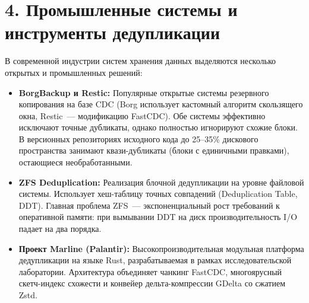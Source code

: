 \documentclass[a4paper,14pt]{extarticle}
\begin{document}
\section*{4. Промышленные системы и инструменты дедупликации}

В современной индустрии систем хранения данных выделяются несколько открытых и промышленных решений:
\begin{itemize}
    \item \textbf{BorgBackup и Restic:} Популярные открытые системы резервного копирования на базе CDC (Borg использует кастомный алгоритм скользящего окна, Restic~--- модификацию FastCDC). Обе системы эффективно исключают точные дубликаты, однако полностью игнорируют схожие блоки. В версионных репозиториях исходного кода до 25--35\% дискового пространства занимают квази-дубликаты (блоки с единичными правками), остающиеся необработанными.
    \item \textbf{ZFS Deduplication:} Реализация блочной дедупликации на уровне файловой системы. Использует хеш-таблицу точных совпадений (Deduplication Table, DDT). Главная проблема ZFS~--- экспоненциальный рост требований к оперативной памяти: при вымывании DDT на диск производительность I/O падает на два порядка.
    \item \textbf{Проект Marline (Palantir):} Высокопроизводительная модульная платформа дедупликации на языке Rust, разрабатываемая в рамках исследовательской лаборатории. Архитектура объединяет чанкинг FastCDC, многоярусный скетч-индекс схожести и конвейер дельта-компрессии GDelta со сжатием Zstd.
\end{itemize}
\end{document}
